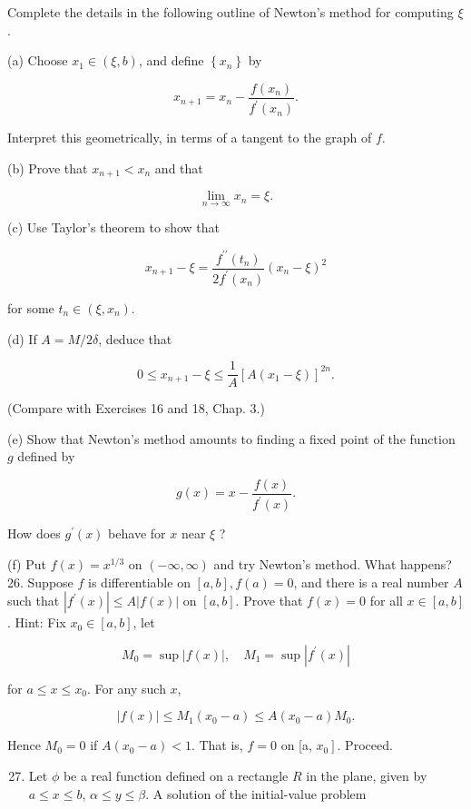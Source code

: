 \documentclass[10pt]{article}
\begin{document}
Complete the details in the following outline of Newton's method for computing $\xi$.

(a) Choose $x_{1} \in(\xi, b)$, and define $\left\{x_{n}\right\}$ by

$$
x_{n+1}=x_{n}-\frac{f\left(x_{n}\right)}{f^{\prime}\left(x_{n}\right)} .
$$

Interpret this geometrically, in terms of a tangent to the graph of $f$.

(b) Prove that $x_{n+1}<x_{n}$ and that

$$
\lim _{n \rightarrow \infty} x_{n}=\xi .
$$

(c) Use Taylor's theorem to show that

$$
x_{n+1}-\xi=\frac{f^{\prime \prime}\left(t_{n}\right)}{2 f^{\prime}\left(x_{n}\right)}\left(x_{n}-\xi\right)^{2}
$$

for some $t_{n} \in\left(\xi, x_{n}\right)$.

(d) If $A=M / 2 \delta$, deduce that

$$
0 \leq x_{n+1}-\xi \leq \frac{1}{A}\left[A\left(x_{1}-\xi\right)\right]^{2 n} .
$$

(Compare with Exercises 16 and 18, Chap. 3.)

(e) Show that Newton's method amounts to finding a fixed point of the function $g$ defined by

$$
g(x)=x-\frac{f(x)}{f^{\prime}(x)} .
$$

How does $g^{\prime}(x)$ behave for $x$ near $\xi$ ?

(f) Put $f(x)=x^{1 / 3}$ on $(-\infty, \infty)$ and try Newton's method. What happens? 26. Suppose $f$ is differentiable on $[a, b], f(a)=0$, and there is a real number $A$ such that $\left|f^{\prime}(x)\right| \leq A|f(x)|$ on $[a, b]$. Prove that $f(x)=0$ for all $x \in[a, b]$. Hint: Fix $x_{0} \in[a, b]$, let

$$
M_{0}=\sup |f(x)|, \quad M_{1}=\sup \left|f^{\prime}(x)\right|
$$

for $a \leq x \leq x_{0}$. For any such $x$,

$$
|f(x)| \leq M_{1}\left(x_{0}-a\right) \leq A\left(x_{0}-a\right) M_{0} .
$$

Hence $M_{0}=0$ if $A\left(x_{0}-a\right)<1$. That is, $f=0$ on [a, $\left.x_{0}\right]$. Proceed.

\begin{enumerate}
  \setcounter{enumi}{26}
  \item Let $\phi$ be a real function defined on a rectangle $R$ in the plane, given by $a \leq x \leq b$, $\alpha \leq y \leq \beta$. A solution of the initial-value problem
\end{enumerate}
\end{document}

